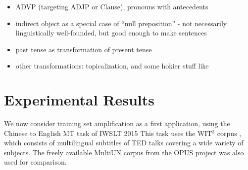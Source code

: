 {\begin{itemize}
\item ADVP (targeting ADJP or Clause), pronouns with antecedents 
\item indirect object as a special case of ``null preposition'' - not necessarily linguistically well-founded, but good enough to make sentences
\item past tense as transformation of present tense  %
\item other transformations: topicalization, and some hokier stuff like  
\end{itemize}



\noindent\makebox[\linewidth]{\rule{\paperwidth}{0.4pt}} %
} %










\section{Experimental Results}
\label{supersec:experimental_results}

\label{sec:experiments}
We now consider training set amplification as a first application, using the Chinese to English MT task of IWSLT 2015 
This task uses the WIT$^3$ corpus , which consists of multilingual subtitles of TED talks covering a wide variety of subjects. 
The freely available MultiUN corpus  from the OPUS project  was also used for comparison.

